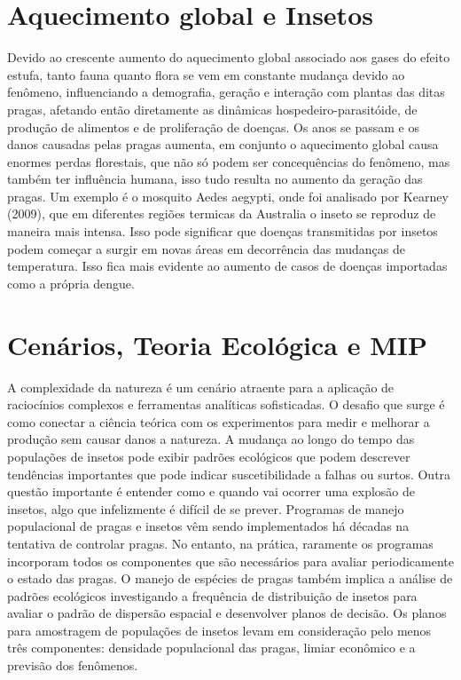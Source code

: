 \section{Aquecimento global e Insetos}
Devido ao crescente aumento do aquecimento global associado aos gases do efeito estufa, tanto fauna quanto flora se vem em constante mudança devido ao fenômeno, influenciando a demografia, geração e interação com plantas das ditas pragas, afetando então diretamente as dinâmicas hospedeiro-parasitóide, de produção de alimentos e de proliferação de doenças. Os anos se passam e os danos causadas pelas pragas aumenta, em conjunto o aquecimento global causa enormes perdas florestais, que não só podem ser concequências do fenômeno, mas também ter influência humana, isso tudo resulta no aumento da geração das pragas.
Um exemplo é o mosquito Aedes aegypti, onde foi analisado por Kearney (2009), que em diferentes regiões termicas da Australia o inseto se reproduz de maneira mais intensa. Isso pode significar que doenças transmitidas por insetos podem começar a surgir em novas áreas em decorrência das mudanças de temperatura. Isso fica mais evidente ao aumento de casos de doenças importadas como a própria dengue.


\section{Cenários, Teoria Ecológica e MIP}

A complexidade da natureza é um cenário atraente para a aplicação de raciocínios complexos e ferramentas analíticas sofisticadas. O desafio que surge é como conectar a ciência teórica com os experimentos para medir e melhorar a produção sem causar danos a natureza. A mudança ao longo do tempo das populações de insetos pode exibir padrões ecológicos que podem descrever tendências importantes que pode indicar suscetibilidade a falhas ou surtos. 
Outra questão importante é entender como e quando vai ocorrer uma explosão de insetos, algo que infelizmente é difícil de se prever. Programas de manejo populacional de pragas e insetos vêm sendo implementados há décadas na tentativa de controlar pragas. No entanto, na prática, raramente os programas incorporam todos os componentes que são necessários para avaliar periodicamente o estado das pragas. O manejo de espécies de pragas também implica a análise de padrões ecológicos investigando a frequência de distribuição de insetos para avaliar o padrão de dispersão espacial e desenvolver planos de decisão. Os planos para amostragem de populações de insetos levam em consideração pelo menos três componentes: densidade populacional das pragas, limiar econômico e a previsão dos fenômenos.

